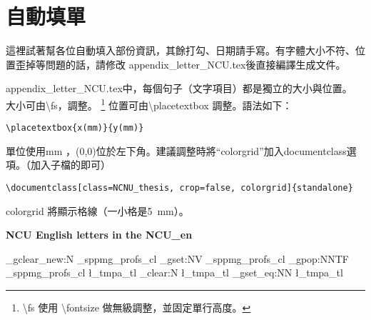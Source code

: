 \documentclass[class=NCNU_thesis, crop=false]{standalone}
\begin{document}
\chapter{自動填單}
這裡試著幫各位自動填入部份資訊，其餘打勾、日期請手寫。有字體大小不符、位置歪掉等問題的話，請修改 appendix\_letter\_NCU.tex後直接編譯生成文件。

appendix\_letter\_NCU.tex中，每個句子（文字項目）都是獨立的大小與位置。 大小可由\textbackslash{}fs，調整。
\footnote{\textbackslash{}fs 使用 \textbackslash{}fontsize 做無級調整，並固定單行高度。 }
位置可由\textbackslash{}placetextbox 調整。語法如下：
\begin{lstlisting}[style=LatexStyle,caption={}]
\placetextbox{x(mm)}{y(mm)}
\end{lstlisting}
單位使用mm ，(0,0)位於左下角。建議調整時將``colorgrid''加入documentclass選項。（加入子檔的即可）
\begin{lstlisting}[style=LatexStyle,caption={}]
\documentclass[class=NCNU_thesis, crop=false, colorgrid]{standalone}
\end{lstlisting}
colorgrid 將顯示格線（一小格是\SI{5}{\milli\metre}）。

\begin{center}
{ \noindent\color{red}\bfseries\Large NCU English letters in the NCU\_en}
\end{center}


\ExplSyntaxOn
    \clist_gclear_new:N \g_sppmg_profs_cl
    \clist_gset:NV \g_sppmg_profs_cl \profs
    \clist_gpop:NNTF \g_sppmg_profs_cl \l_tmpa_tl {}{ \tl_clear:N \l_tmpa_tl}
    \cs_gset_eq:NN \mprof \l_tmpa_tl
\ExplSyntaxOff

\cleardoublepage
\pagestyle{empty}
\sffamily


\end{document}
